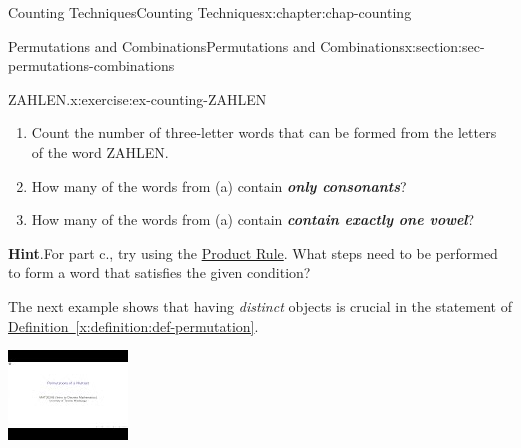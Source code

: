 \documentclass[oneside,10pt,]{book}
\newcommand{\blocktitlefont}{\relax}
\newcommand{\xreffont}{\relax}
\newcommand{\alert}[1]{\textbf{\textit{#1}}}
\numberwithin{equation}{section}
\newlength{\qrsize}
\newlength{\previewwidth}
\begin{document}
\begin{chapterptx}{Counting Techniques}{}{Counting Techniques}{}{}{x:chapter:chap-counting}
\begin{sectionptx}{Permutations and Combinations}{}{Permutations and Combinations}{}{}{x:section:sec-permutations-combinations}
\begin{inlineexercise}{ZAHLEN.}{x:exercise:ex-counting-ZAHLEN}
%
\begin{enumerate}[label=(\alph*)]
\item{}Count the number of three-letter words that can be formed from the letters of the word ZAHLEN.%
\item{}How many of the words from (a) contain \alert{only consonants}?%
\item{}How many of the words from (a) contain \alert{contain exactly one vowel}?%
\end{enumerate}
%
\par\smallskip%
\noindent\textbf{\blocktitlefont Hint}.\hypertarget{g:hint:id524052}{}\quad{}For part c., try using the \hyperref[x:principle:prin-prod-rule]{Product Rule}. What steps need to be performed to form a word that satisfies the given condition?%
\end{inlineexercise}%
The next example shows that having \emph{distinct} objects is crucial in the statement of \hyperref[x:definition:def-permutation]{Definition~{\xreffont\ref{x:definition:def-permutation}}}.%
\begin{sidebyside}{1}{0}{0}{0}%
\begin{sbspanel}{1}%
\setlength{\qrsize}{9em}
\setlength{\previewwidth}{\linewidth}
\addtolength{\previewwidth}{-\qrsize}
\begin{tcbraster}[raster columns=2, raster column skip=1pt, raster halign=center, raster force size=false, raster left skip=0pt, raster right skip=0pt]%
\begin{tcolorbox}[previewstyle, width=\previewwidth]%
\includegraphics[width=0.80\linewidth,height=\qrsize,keepaspectratio]{images/video-permutation-multiset.jpg}%
\end{tcolorbox}%
\begin{tcolorbox}[qrstyle]%
{\hypersetup{urlcolor=black}}%

\end{tcolorbox}
\end{tcbraster}
\end{sbspanel}
\end{sidebyside}
\end{sectionptx}
\end{chapterptx}
\end{document}
